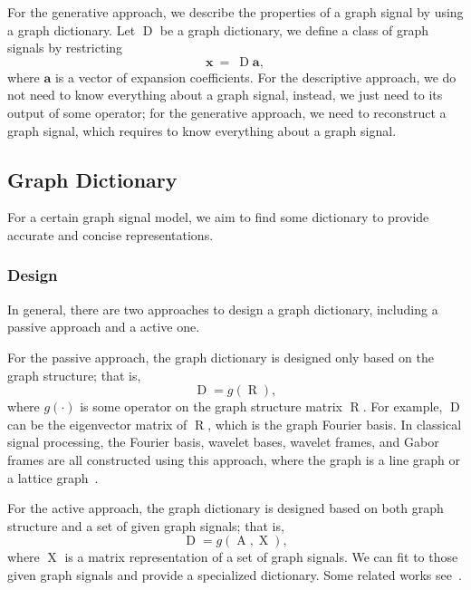 \documentclass[journal,twocolumn,10pt]{IEEEtran}
\theoremstyle{definition}
\def\a{\mathbf{a}}
\def\x{\mathbf{x}}
\DeclareMathOperator{\Adj}{A}
\DeclareMathOperator{\D}{D}
\DeclareMathOperator{\RR}{R}
\DeclareMathOperator{\X}{X}
\begin{document}
For the generative approach, we describe the properties of a graph signal by using a graph dictionary. Let $\D$ be a graph dictionary, we define a class of graph signals by restricting
\begin{equation*}
 \x \ = \ \D \a,
\end{equation*}
where $\a$ is a vector of expansion coefficients. For the descriptive approach, we do not need to know everything about a graph signal, instead, we just need to its output of some operator; for the generative approach, we need to reconstruct a graph signal, which requires to know everything about a graph signal.


\subsection{Graph Dictionary}
For a certain graph signal model, we aim to find some dictionary to provide accurate and concise representations.

\subsubsection{Design}
In general, there are two approaches to design a graph dictionary, including a passive approach and a active one.

For the passive approach, the graph dictionary is designed only based on the graph structure; that is,
\begin{equation*}
 \D  = g(\RR),
\end{equation*}
where $g(\cdot)$ is some operator on the graph structure matrix $\RR$. For example, $\D$ can be the eigenvector matrix of $\RR$, which is the graph Fourier basis. In classical signal processing, the Fourier basis, wavelet bases, wavelet frames, and Gabor frames are all constructed using this approach, where the graph is a line graph or a lattice graph~\cite{PueschelM:08}.


For the active approach, the graph dictionary is designed based on both graph structure and a set of given graph signals; that is,
\begin{equation*}
 \D  = g(\Adj, \X),
\end{equation*}
where $\X$ is a matrix representation of a set of graph signals. We can fit to those given graph signals and provide a specialized dictionary. Some related works see~\cite{DongTFV:14, ThanouSF:14}.
\end{document}
